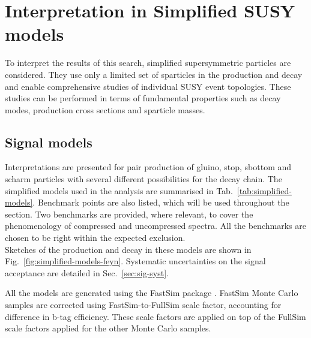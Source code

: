 \section{Interpretation in Simplified SUSY models}
\label{sec:susy}
To interpret the results of this search, simplified
supersymmetric particles are considered.  They use only a limited set of
sparticles in the production and decay and enable comprehensive studies of
individual SUSY event topologies. These studies can be performed in terms of
fundamental properties such as decay modes, production cross sections and
sparticle masses.

\subsection{Signal models}
\label{sec:susy_models}
Interpretations are presented for pair production of gluino, stop, sbottom and
scharm particles with several different possibilities for the decay chain. The
simplified models used in the analysis are summarised in
Tab.~\ref{tab:simplified-models}. Benchmark points are also listed, which will
be used throughout the section. Two benchmarks are provided, where relevant,
to cover the phenomenology of compressed and uncompressed spectra. All the
benchmarks are chosen to be right within the expected exclusion. \\
Sketches of the production and decay in these models are shown in
Fig.~\ref{fig:simplified-models-feyn}. Systematic uncertainties on the signal
acceptance are detailed in Sec.~\ref{sec:sig-syst}.

All the models are generated using the FastSim package \cite{Abdullin:2011zz}.
FastSim Monte Carlo samples are corrected using FastSim-to-FullSim scale factor,
accounting for difference in b-tag efficiency. These scale factors are applied
on top of the FullSim scale factors applied for the other Monte Carlo samples.


